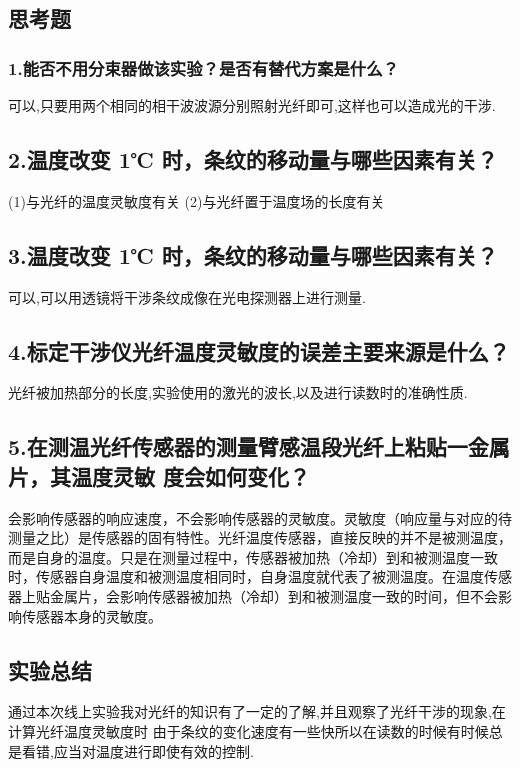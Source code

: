 \documentclass{article}
\begin{document}
\subsection*{思考题}

\subsubsection*{1.能否不用分束器做该实验？是否有替代方案是什么？}
可以,只要用两个相同的相干波波源分别照射光纤即可,这样也可以造成光的干涉.

\subsection*{2.温度改变 1℃ 时，条纹的移动量与哪些因素有关？}
(1)与光纤的温度灵敏度有关
(2)与光纤置于温度场的长度有关

\subsection*{3.温度改变 1℃ 时，条纹的移动量与哪些因素有关？}

可以,可以用透镜将干涉条纹成像在光电探测器上进行测量.

\subsection*{4.标定干涉仪光纤温度灵敏度的误差主要来源是什么？}
光纤被加热部分的长度,实验使用的激光的波长,以及进行读数时的准确性质.

\subsection*{5.在测温光纤传感器的测量臂感温段光纤上粘贴一金属片，其温度灵敏
度会如何变化？}
会影响传感器的响应速度，不会影响传感器的灵敏度。灵敏度（响应量与对应的待测量之比）是传感器的固有特性。光纤温度传感器，直接反映的并不是被测温度，而是自身的温度。只是在测量过程中，传感器被加热（冷却）到和被测温度一致时，传感器自身温度和被测温度相同时，自身温度就代表了被测温度。在温度传感器上贴金属片，会影响传感器被加热（冷却）到和被测温度一致的时间，但不会影响传感器本身的灵敏度。


\subsection*{实验总结}
通过本次线上实验我对光纤的知识有了一定的了解,并且观察了光纤干涉的现象,在计算光纤温度灵敏度时
由于条纹的变化速度有一些快所以在读数的时候有时候总是看错,应当对温度进行即使有效的控制.
\end{document}

